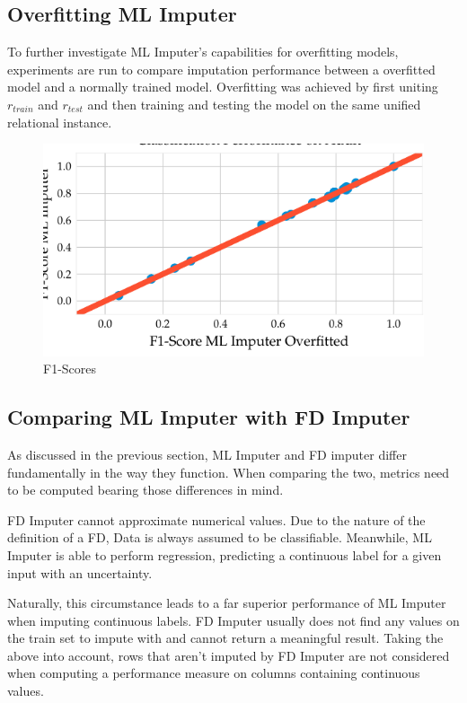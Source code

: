 \subsection{Overfitting ML Imputer}
To further investigate ML Imputer's capabilities for overfitting models, experiments are run to compare imputation performance between a overfitted model and a normally trained model.
Overfitting was achieved by first uniting \( r_{train} \) and \( r_{test} \) and then training and testing the model on the same unified relational instance.

\begin{figure}[ht]
     \centering
     \includegraphics[width=.8\textwidth]{../figures/adult/f1_ml_overfit_adult.pdf}
     \caption{F1-Scores }
     \label{fig:f1-ml-overfit-chess}
 \end{figure}


\subsection{Comparing ML Imputer with FD Imputer}
As discussed in the previous section, ML Imputer and FD imputer differ fundamentally in the way they function.
When comparing the two, metrics need to be computed bearing those differences in mind.

FD Imputer cannot approximate numerical values.
Due to the nature of the definition of a FD, Data is always assumed to be classifiable.
Meanwhile, ML Imputer is able to perform regression, predicting a continuous label for a given input with an uncertainty.

Naturally, this circumstance leads to a far superior performance of ML Imputer when imputing continuous labels.
FD Imputer usually does not find any values on the train set to impute with and cannot return a meaningful result.
Taking the above into account, rows that aren't imputed by FD Imputer are not considered when computing a performance measure on columns containing continuous values.

